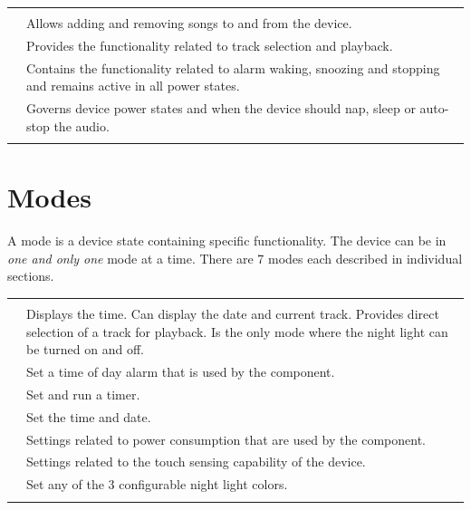 \begin{table}[H]
\centering
\begin{tabu}{ X[1,c,m] | X[3,l,m] }
  \thrule
   &  \\ \mrule

  \hyperref[USB]{}
    & Allows adding and removing songs to and from the device. \\ 
  \hyperref[Audio]{}
    & Provides the functionality related to track selection and
      playback. \\ 
  \hyperref[Alarm]{}
    & Contains the functionality related to alarm waking, snoozing and stopping
      and remains active in all power states. \\ 
  \hyperref[Power]{}
    & Governs device power states and when the device should nap, sleep or
      auto-stop the audio. \\
  \bhrule
\end{tabu}
\end{table}

\section{Modes}

A mode is a device state containing specific functionality.  The device can be
in \textit{one and only one} mode at a time.  There are \num{7} modes each
described in individual sections.

\begin{table}[H]
\centering
\begin{tabu}{ X[1,c,m] | X[3,l,m] }
  \thrule
   &  \\ \mrule

  \hyperref[Clock]{}
    & Displays the time. Can display the date and current track.
    Provides direct selection of a track for playback. Is the only mode
    where the night light can be turned on and off. \\ 
  \hyperref[Set Alarm]{} & Set a time of day alarm that is used by
    the \hyperref[Alarm]{} component. \\ 
  \hyperref[Timer]{} & Set and run a timer. \\ 
  \hyperref[Set Clock]{} & Set the time and date. \\ 
  \hyperref[Power Settings]{} & Settings related to power consumption
    that are used by the \hyperref[Power]{} component. \\ 
  \hyperref[Touch Settings]{} & Settings related to the touch sensing
    capability of the device. \\ 
  \hyperref[Set Night Light]{} & Set any of the \num{3} configurable
    night light colors. \\

  \bhrule
\end{tabu}
\end{table}

